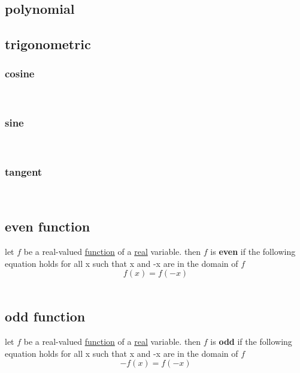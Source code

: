 \documentclass[a4paper,12pt]{article}
\newcommand{\?}{\stackrel{?}{=}}
\begin{document}
\subsection{polynomial}
\label{sec:orgbab33ca}
\subsection{trigonometric}
\label{sec:org4d52575}
\subsubsection{cosine}
\label{sec:org65fe77c}
\\[0pt]

\subsubsection{sine}
\label{sec:org53499b5}
\\[0pt]

\subsubsection{tangent}
\label{sec:org42368ee}
\\[0pt]

\subsection{even function}
\label{sec:org252ecea}
\begin{definition}
let \(f\) be a real-valued \href{discrete_maths2.org}{function} of a \hyperref[sec:org6805ed1]{real} variable. then \(f\) is \textbf{even} if the following equation holds for all x such that x and -x are in the domain of \(f\)\\[0pt]
\[
  f(x) = f(-x)
\]\\[0pt]
\end{definition}
\subsection{odd function}
\label{sec:org19ea39b}
\begin{definition}
let \(f\) be a real-valued \href{discrete_maths2.org}{function} of a \hyperref[sec:org6805ed1]{real} variable. then \(f\) is \textbf{odd} if the following equation holds for all x such that x and -x are in the domain of \(f\)\\[0pt]
\[
  -f(x) = f(-x)
\]\\[0pt]
\end{definition}
\end{document}
